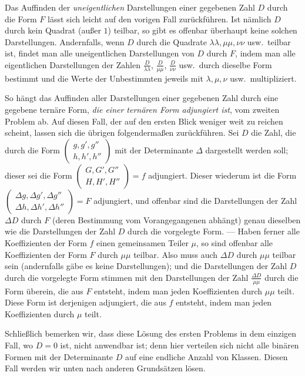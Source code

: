 Das Auffinden der \textit{uneigentlichen} Darstellungen einer gegebenen Zahl
$D$ durch die Form $F$ lässt sich leicht auf den vorigen Fall
zurückführen. Ist nämlich $D$ durch kein Quadrat (außer $1$)
teilbar, so gibt es offenbar überhaupt keine solchen Darstellungen.
Andernfalls, wenn $D$ durch die Quadrate $\lambda\lambda,\mu\mu,\nu\nu$ usw.\ teilbar ist,
findet man alle uneigentlichen Darstellungen von $D$ durch $F$,
indem man alle eigentlichen Darstellungen der Zahlen $\frac{D}{\lambda\lambda}$,
$\frac{D}{\mu\mu}$, $\frac{D}{\nu\nu}$ usw.\ durch dieselbe Form bestimmt und die Werte der
Unbestimmten jeweils mit $\lambda,\mu,\nu$ usw.\ multipliziert.

So hängt das Auffinden aller Darstellungen einer gegebenen Zahl durch eine
gegebene ternäre Form, \textit{die einer ternären Form adjungiert ist},
vom zweiten Problem ab. Auf diesen Fall, der auf den ersten Blick weniger
weit zu reichen scheint, lassen sich die übrigen folgendermaßen zurückführen.
Sei $D$ die Zahl, die durch die Form
$\left(\begin{smallmatrix}g,g',g''\\h,h',h''\end{smallmatrix}\right)$
mit der Determinante $\Delta$ dargestellt werden soll; dieser sei die Form
$\left(\begin{smallmatrix}G,G',G''\\H,H',H''\end{smallmatrix}\right)=f$
adjungiert. Dieser wiederum ist die Form
$\left(\begin{smallmatrix}\Delta g,\Delta g',\Delta g''\\\Delta h,\Delta h',\Delta h''\end{smallmatrix}\right)=F$
adjungiert, und offenbar sind die Darstellungen der Zahl $\Delta D$ durch
$F$ (deren Bestimmung vom Vorangegangenen abhängt) genau dieselben
wie die Darstellungen der Zahl $D$ durch die vorgelegte Form.
--- Haben ferner alle Koeffizienten der Form $f$ einen gemeinsamen
Teiler $\mu$, so sind offenbar alle Koeffizienten der Form $F$
durch $\mu\mu$ teilbar. Also muss auch $\Delta D$ durch $\mu\mu$ teilbar
sein (andernfalls gäbe es keine Darstellungen); und die Darstellungen
der Zahl $D$ durch die vorgelegte Form stimmen mit den Darstellungen
der Zahl $\frac{\Delta D}{\mu\mu}$ durch die Form überein, die aus $F$ entsteht,
indem man jeden Koeffizienten durch $\mu\mu$ teilt. Diese Form ist derjenigen
adjungiert, die aus $f$ entsteht, indem man jeden Koeffizienten
durch $\mu$ teilt.

Schließlich bemerken wir, dass diese Lösung des ersten Problems in dem
einzigen Fall, wo
$D=0$ ist, nicht anwendbar ist; denn hier verteilen sich nicht alle
binären Formen mit der Determinante $D$ auf eine endliche Anzahl von
Klassen. Diesen Fall werden wir unten nach anderen Grundsätzen lösen.

